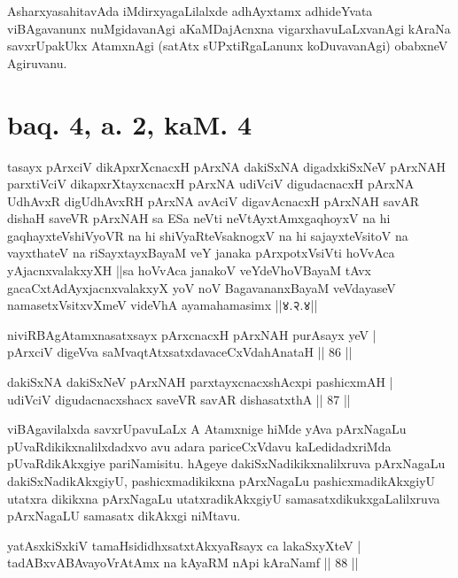 \begin{artha}
AsharxyasahitavAda iMdirxyagaLilalxde adhAyxtamx adhideYvata viBAgavanunx nuMgidavanAgi aKaMDajAcnxna vigarxhavuLaLxvanAgi kAraNa savxrUpakUkx AtamxnAgi (satAtx sUPxtiRgaLanunx koDuvavanAgi) obabxneV Agiruvanu.
\end{artha}

\section*{baq. 4, a. 2, kaM. 4}

\begin{shl}
tasayx pArxciV dikApxrXcnacxH pArxNA dakiSxNA digadxkiSxNeV pArxNAH parxtiVciV dikapxrXtayxcnacxH pArxNA udiVciV digudacnacxH pArxNA UdhAvxR digUdhAvxRH pArxNA avAciV digavAcnacxH pArxNAH savAR dishaH saveVR pArxNAH sa ESa neVti neVtAyxtAmxgaqhoyxV na hi gaqhayxteV\s shiVyoVR na hi shiVyaRteV\s saknogxV na hi sajayxteV\s sitoV na vayxthateV na riSayxtayxBayaM veY janaka pArxpotxV\s siVti hoVvAca yAjacnxvalakxyXH ||sa hoVvAca janakoV veYdeVhoV\s BayaM tAvx gacaCxtAdAyxjacnxvalakxyX yoV noV BagavananxBayaM veVdayaseV namasetxV\s sitxvXmeV videVhA ayamahamasimx ||४.२.४||
\end{shl}

\begin{shl}
niviRBAgAtamxnasatxsayx pArxcnacxH pArxNAH purA\s sayx yeV |\\
pArxciV digeVva saMvaqtAtxsatxdavaceCxVdahAnataH \hfill || 86 || 
\end{shl}

\begin{shl}
dakiSxNA dakiSxNeV pArxNAH parxtayxcnacxshAcxpi pashicxmAH |\\
udiVciV digudacnacxshacx saveVR savAR dishasatxthA \hfill || 87 || 
\end{shl}

\begin{artha}
viBAgavilalxda savxrUpavuLaLx A Atamxnige hiMde yAva pArxNagaLu pUvaRdikikxnalilxdadxvo avu adara pariceCxVdavu kaLedidadxriMda pUvaRdikAkxgiye pariNamisitu. hAgeye dakiSxNadikikxnalilxruva pArxNagaLu dakiSxNadikAkxgiyU, pashicxmadikikxna pArxNagaLu pashicxmadikAkxgiyU utatxra dikikxna pArxNagaLu utatxradikAkxgiyU samasatxdikukxgaLalilxruva pArxNagaLU samasatx dikAkxgi niMtavu.
\end{artha}

\begin{shl}
yatAsxkiSxkiV tamaHsididhxsatxtAkxyaRsayx ca lakaSxyXteV |\\
tadABxvABAvayoVrAtAmx na kAyaRM nApi kAraNamf \hfill || 88 || 
\end{shl}

